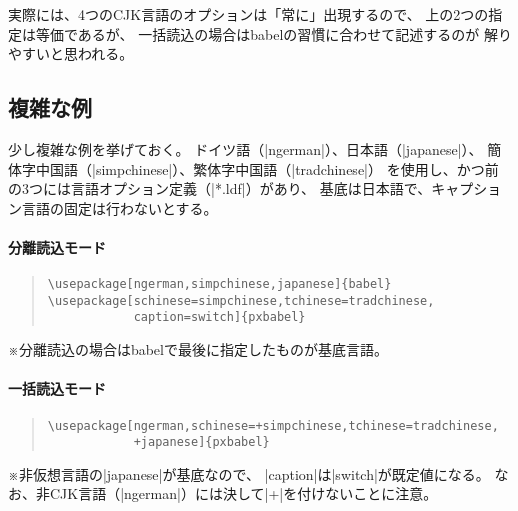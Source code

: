 \documentclass[uplatex,dvipdfmx,a4paper]{jsarticle}
\newcommand{\Pkg}[1]{\textsf{#1}}
\newcommand{\Note}{\par\noindent ※}
\newcommand{\XS}{\hspace{\xkanjiskip}}
\begin{document}
実際には、4つのCJK言語のオプションは「常に」出現するので、
上の2つの指定は等価であるが、
一括読込の場合は\Pkg{babel}の習慣に合わせて記述するのが
解りやすいと思われる。

\subsection{複雑な例}
\label{ssec:complex-loading}

少し複雑な例を挙げておく。
ドイツ語（|ngerman|）、日本語（|japanese|）、
簡体字中国語（|simpchinese|）、繁体字中国語（|tradchinese|）
を使用し、かつ前の3つには言語オプション定義（|*.ldf|）があり、
基底は日本語で、キャプション言語の固定は行わないとする。

\paragraph{分離読込モード}

\begin{quote}\begin{verbatim}
\usepackage[ngerman,simpchinese,japanese]{babel}
\usepackage[schinese=simpchinese,tchinese=tradchinese,
            caption=switch]{pxbabel}
\end{verbatim}\end{quote}

\Note 分離読込の場合は\Pkg{babel}で最後に指定したものが基底言語。

\paragraph{一括読込モード}
\begin{quote}\begin{verbatim}
\usepackage[ngerman,schinese=+simpchinese,tchinese=tradchinese,
            +japanese]{pxbabel}
\end{verbatim}\end{quote}

\Note 非仮想言語の|japanese|が基底なので、
|caption|は|switch|が既定値になる。
なお、非CJK言語（|ngerman|）には決して\XS|+|\XS を付けないことに注意。

\end{document}
